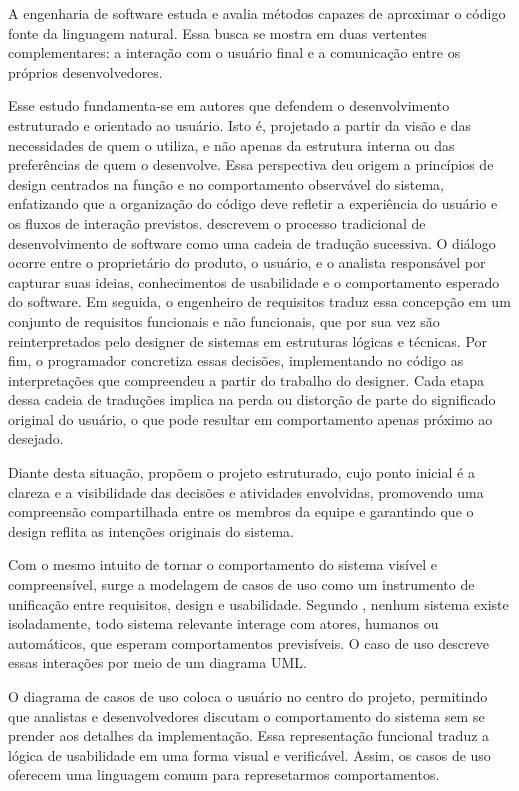 \documentclass[12pt,a4paper]{article}
\begin{document}
A engenharia de software estuda e avalia métodos capazes de aproximar o código fonte da linguagem natural. Essa busca se mostra em duas vertentes complementares: a interação com o usuário final e a comunicação entre os próprios desenvolvedores. 

Esse estudo fundamenta-se em autores que defendem o desenvolvimento estruturado e orientado ao usuário. Isto é, projetado a partir da visão e das necessidades de quem o utiliza, e não apenas da estrutura interna ou das preferências de quem o desenvolve. Essa perspectiva deu origem a princípios de design centrados na função e no comportamento observável do sistema, enfatizando que a organização do código deve refletir a experiência do usuário e os fluxos de interação previstos. \textcite{yourdon1979structured} descrevem o processo tradicional de desenvolvimento de software como uma cadeia de tradução sucessiva. O diálogo ocorre entre o proprietário do produto, o usuário, e o analista responsável por capturar suas ideias, conhecimentos de usabilidade e o comportamento esperado do software. Em seguida, o engenheiro de requisitos traduz essa concepção em um conjunto de requisitos funcionais e não funcionais, que por sua vez são reinterpretados pelo designer de sistemas em estruturas lógicas e técnicas. Por fim, o programador concretiza essas decisões, implementando no código as interpretações que compreendeu a partir do trabalho do designer. Cada etapa dessa cadeia de traduções implica na perda ou distorção de parte do significado original do usuário, o que pode resultar em comportamento apenas próximo ao desejado.

Diante desta situação, \textcite{yourdon1979structured} propõem o projeto estruturado, cujo ponto inicial é a clareza e a visibilidade das decisões e atividades envolvidas, promovendo uma compreensão compartilhada entre os membros da equipe e garantindo que o design reflita as intenções originais do sistema.

Com o mesmo intuito de tornar o comportamento do sistema visível e compreensível, surge a modelagem de casos de uso como um instrumento de unificação entre requisitos, design e usabilidade. Segundo \textcite{booch1999unified}, nenhum sistema existe isoladamente, todo sistema relevante interage com atores, humanos ou automáticos, que esperam comportamentos previsíveis. O caso de uso descreve essas interações por meio de um diagrama UML.

O diagrama de casos de uso coloca o usuário no centro do projeto, permitindo que analistas e desenvolvedores discutam o comportamento do sistema sem se prender aos detalhes da implementação. Essa representação funcional traduz a lógica de usabilidade em uma forma visual e verificável. Assim, os casos de uso oferecem uma linguagem comum para represetarmos comportamentos.
\end{document}
